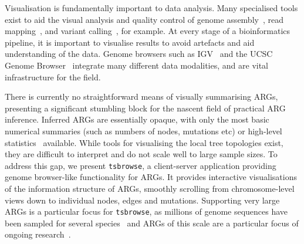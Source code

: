 \documentclass[unnumsec,webpdf,contemporary,large,namedate]{oup-authoring-template}%
\begin{document}
Visualisation is fundamentally important to data analysis.
Many specialised tools exist to aid the visual analysis and
quality control
of genome assembly~\citep{wick2015bandage,challis2020blobtoolkit},
read mapping~\citep{robinson2011integrative},
and variant
calling~\citep{robinson2017variant,tollefson2019viva,konig2023divbrowse},
for example.
At every stage of a bioinformatics pipeline, it is important to visualise
results to avoid artefacts and aid understanding of the data.
Genome browsers such as IGV~\citep{robinson2011integrative} and the
UCSC Genome Browser~\citep{nassar2023ucsc} integrate many different
data modalities, and are vital infrastructure for the field.

There is currently no straightforward means of visually summarising
ARGs, presenting a significant stumbling block for the nascent
field of practical ARG inference. Inferred ARGs are essentially opaque,
with only the most basic numerical summaries (such as numbers
of nodes, mutations etc) or high-level
statistics~\citep{ralph2020efficiently} available. While tools
for visualising the local tree topologies exist, they are difficult
to interpret and do not scale well to large sample sizes.
To address this gap, we present \texttt{tsbrowse}, a
client-server application providing genome browser-like
functionality for ARGs.
It provides interactive visualisations of the information structure
of ARGs, smoothly scrolling from chromosome-level views down to
individual nodes, edges and mutations. Supporting very large ARGs is a
particular focus for \texttt{tsbrowse}, as millions of genome
sequences have been sampled for several
species~\citep{cesarani2022multibreed,stark2024call,hunt2024addressing}
and ARGs of this scale are a particular focus of ongoing
research~\citep{kelleher2019inferring,zhang2023biobank,
    zhan2023towards,anderson2023on,gunnarsson2024scalable}.
\end{document}

